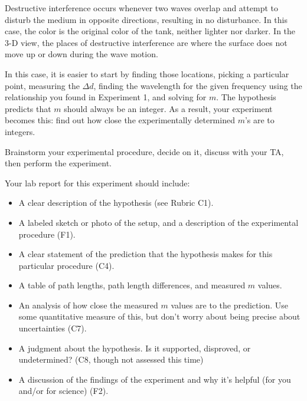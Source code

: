 Destructive interference occurs whenever two waves overlap and attempt to disturb the medium in opposite directions, resulting in no disturbance. In this case, the color is the original color of the tank, neither lighter nor darker. In the 3-D view, the places of destructive interference are where the surface does not move up or down during the wave motion.



In this case, it is easier to start by finding those locations, picking a particular point, measuring the $\Delta d$, finding the wavelength for the given frequency using the relationship you found in Experiment 1, and solving for $m$. The hypothesis predicts that $m$ should always be an integer. As a result, your experiment becomes this: find out how close the experimentally determined $m$'s are to integers.

Brainstorm your experimental procedure, decide on it, discuss with your TA, then perform the experiment.

Your lab report for this experiment should include:
\begin{itemize}
	\item A clear description of the hypothesis (see Rubric C1).
	
	\item A labeled sketch or photo of the setup, and a description of the experimental procedure (F1).
	
	\item A clear statement of the prediction that the hypothesis makes for this particular procedure (C4).

	\item A table of path lengths, path length differences, and measured $m$ values.
	
	\item An analysis of how close the measured $m$ values are to the prediction. Use some quantitative measure of this, but don't worry about being precise about uncertainties (C7).
	
	\item A judgment about the hypothesis. Is it supported, disproved, or undetermined? (C8, though not assessed this time)
	
	\item A discussion of the findings of the experiment and why it's helpful (for you and/or for science) (F2).
\end{itemize}

